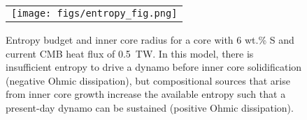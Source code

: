  \begin{figure}[H] %
   \centering
\begin{tabular}{c}
 \texttt{[image: figs/entropy\_fig.png]} 
\end{tabular}
\caption{Entropy budget and inner core radius for a core with 6 wt.\% S and
  current CMB heat flux of 0.5~TW. In this model, there is insufficient entropy to
  drive a dynamo before inner core solidification (negative Ohmic dissipation), but
  compositional sources that arise from inner core growth increase the available
entropy such that a present-day dynamo can be sustained (positive Ohmic dissipation). }
\label{entropy}
\end{figure}
